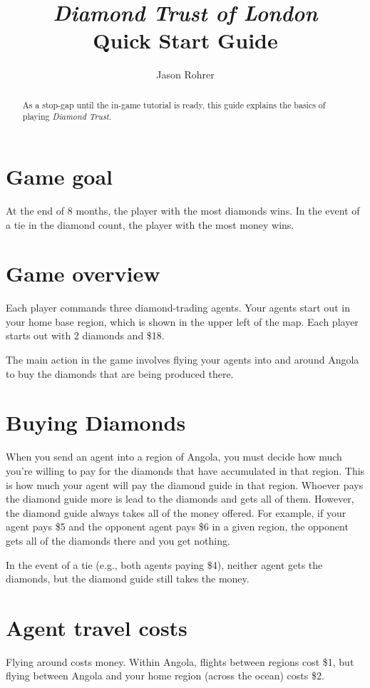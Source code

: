 \documentclass[12pt]{article}
\title{{\it Diamond Trust of London} \\ Quick Start Guide}
\author{Jason Rohrer}
\begin{document}
\maketitle


\begin{abstract}
As a stop-gap until the in-game tutorial is ready, this guide explains the basics of playing {\it Diamond Trust}.
\end{abstract}


\section{Game goal}

At the end of 8 months, the player with the most diamonds wins.  In the event of a tie in the diamond count, the player with the most money wins.

\section{Game overview}
Each player commands three diamond-trading agents.  Your agents start out in your home base region, which is shown in the upper left of the map.  Each player starts out with 2 diamonds and \$18.

The main action in the game involves flying your agents into and around Angola to buy the diamonds that are being produced there.

\section{Buying Diamonds}
When you send an agent into a region of Angola, you must decide how much you're willing to pay for the diamonds that have accumulated in that region.  This is how much your agent will pay the diamond guide in that region.  Whoever pays the diamond guide more is lead to the diamonds and gets all of them.  However, the diamond guide always takes all of the money offered.  For example, if your agent pays \$5 and the opponent agent pays \$6 in a given region, the opponent gets all of the diamonds there and you get nothing.

In the event of a tie (e.g., both agents paying \$4), neither agent gets the diamonds, but the diamond guide still takes the money.

\section{Agent travel costs}
Flying around costs money.  Within Angola, flights between regions cost \$1, but flying between Angola and your home region (across the ocean) costs \$2.
\end{document}
